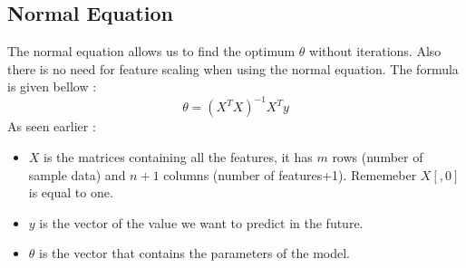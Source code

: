 \documentclass{article}
\begin{document}
\subsection{Normal Equation}
The normal equation allows us to find the optimum $\theta$ without iterations. Also there is no need for feature scaling when using the normal equation. The formula is given bellow :$$\theta = (X^{T}X)^{-1}X^{T}y$$
As seen earlier :
\begin{itemize}
	\item $X$ is the matrices containing all the features, it has $m$ rows (number of sample data) and $n+1$ columns (number of features+1). Rememeber $X[,0]$ is equal to one.
	\item  $y$ is the vector of the value we want to predict in the future.
	\item  $\theta$ is the vector that contains the parameters of the model.
\end{itemize}
\end{document}
